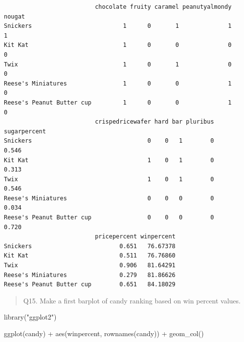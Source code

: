 \documentclass[
  letterpaper,
  DIV=11,
  numbers=noendperiod]{scrartcl}
\newenvironment{Shaded}{\begin{snugshade}}{\end{snugshade}}
\newcommand{\AttributeTok}[1]{\textcolor[rgb]{0.40,0.45,0.13}{#1}}
\newcommand{\DecValTok}[1]{\textcolor[rgb]{0.68,0.00,0.00}{#1}}
\newcommand{\FunctionTok}[1]{\textcolor[rgb]{0.28,0.35,0.67}{#1}}
\newcommand{\NormalTok}[1]{\textcolor[rgb]{0.00,0.23,0.31}{#1}}
\newcommand{\SpecialCharTok}[1]{\textcolor[rgb]{0.37,0.37,0.37}{#1}}
\newcommand{\StringTok}[1]{\textcolor[rgb]{0.13,0.47,0.30}{#1}}
\begin{document}
\begin{Shaded}
\end{Shaded}

\begin{verbatim}
                          chocolate fruity caramel peanutyalmondy nougat
Snickers                          1      0       1              1      1
Kit Kat                           1      0       0              0      0
Twix                              1      0       1              0      0
Reese's Miniatures                1      0       0              1      0
Reese's Peanut Butter cup         1      0       0              1      0
                          crispedricewafer hard bar pluribus sugarpercent
Snickers                                 0    0   1        0        0.546
Kit Kat                                  1    0   1        0        0.313
Twix                                     1    0   1        0        0.546
Reese's Miniatures                       0    0   0        0        0.034
Reese's Peanut Butter cup                0    0   0        0        0.720
                          pricepercent winpercent
Snickers                         0.651   76.67378
Kit Kat                          0.511   76.76860
Twix                             0.906   81.64291
Reese's Miniatures               0.279   81.86626
Reese's Peanut Butter cup        0.651   84.18029
\end{verbatim}

\begin{quote}
Q15. Make a first barplot of candy ranking based on win percent values.
\end{quote}

\begin{Shaded}
\begin{Highlighting}[]
\FunctionTok{library}\NormalTok{(}\StringTok{"ggplot2"}\NormalTok{)}

\FunctionTok{ggplot}\NormalTok{(candy) }\SpecialCharTok{+} 
  \FunctionTok{aes}\NormalTok{(winpercent, }\FunctionTok{rownames}\NormalTok{(candy)) }\SpecialCharTok{+}
  \FunctionTok{geom\_col}\NormalTok{()}
\end{Highlighting}
\end{Shaded}
\end{document}
